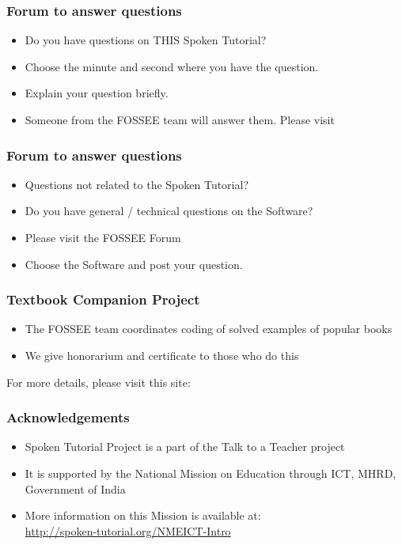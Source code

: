 \documentclass[17pt]{beamer}
\begin{document}
\begin{frame}
\frametitle{Forum to answer questions}
\begin{itemize}
\item Do you have questions on THIS Spoken Tutorial?
\item Choose the minute and second where you have the question.
\item Explain your question briefly.
\item Someone from the FOSSEE team will answer them. Please visit 
\end{itemize}
\begin{center}
{\color{blue}{http://forums.spoken-tutorial.org/}}
 \end{center} 
\end{frame}
\begin{frame}
\frametitle{Forum to answer questions}
\begin{itemize}
\item Questions not related to the Spoken Tutorial?
\item Do you have general / technical questions on the Software?
\item Please visit the FOSSEE Forum
\begin{center}
{\color{blue}{http://forums.fossee.in/}}
 \end{center}
\item Choose the Software and post your question.
\end{itemize}
\end{frame}
\begin{frame}
\frametitle{Textbook Companion Project}
\begin{itemize}
\item The FOSSEE team coordinates coding of solved examples of popular
  books 
\item We give honorarium and certificate to those who do this
\end{itemize}
For more details, please visit this site:
\begin{center}
{\color{blue}{http://tbc-python.fossee.in/}}
\end{center}
\end{frame}
\begin{frame}
\frametitle{Acknowledgements}
\begin{itemize}
\item Spoken Tutorial Project is a part of the Talk to a Teacher  project 
\item It is supported by the National Mission on Education through  ICT, MHRD, Government of India 
\item More information on this Mission is available at: \\{\color{blue}\url{http://spoken-tutorial.org/NMEICT-Intro}}
\end{itemize}
\end{frame}
\end{document}
